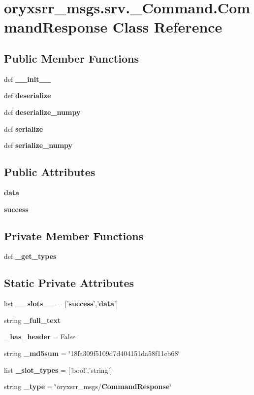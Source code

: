 \section{oryxsrr\-\_\-msgs.\-srv.\-\_\-\-Command.\-Command\-Response \-Class \-Reference}
\label{classoryxsrr__msgs_1_1srv_1_1__Command_1_1CommandResponse}
\subsection*{\-Public \-Member \-Functions}
\begin{DoxyCompactItemize}
\item 
def {\bf \-\_\-\-\_\-init\-\_\-\-\_\-}
\item 
def {\bf deserialize}
\item 
def {\bf deserialize\-\_\-numpy}
\item 
def {\bf serialize}
\item 
def {\bf serialize\-\_\-numpy}
\end{DoxyCompactItemize}
\subsection*{\-Public \-Attributes}
\begin{DoxyCompactItemize}
\item 
{\bf data}
\item 
{\bf success}
\end{DoxyCompactItemize}
\subsection*{\-Private \-Member \-Functions}
\begin{DoxyCompactItemize}
\item 
def {\bf \-\_\-get\-\_\-types}
\end{DoxyCompactItemize}
\subsection*{\-Static \-Private \-Attributes}
\begin{DoxyCompactItemize}
\item 
list {\bf \-\_\-\-\_\-slots\-\_\-\-\_\-} = ['{\bf success}','{\bf data}']
\item 
string {\bf \-\_\-full\-\_\-text}
\item 
{\bf \-\_\-has\-\_\-header} = \-False
\item 
string {\bf \-\_\-md5sum} = \char`\"{}18fa309f5109d7d404151da58f11cb68\char`\"{}
\item 
list {\bf \-\_\-slot\-\_\-types} = ['bool','string']
\item 
string {\bf \-\_\-type} = \char`\"{}oryxsrr\-\_\-msgs/{\bf \-Command\-Response}\char`\"{}
\end{DoxyCompactItemize}


